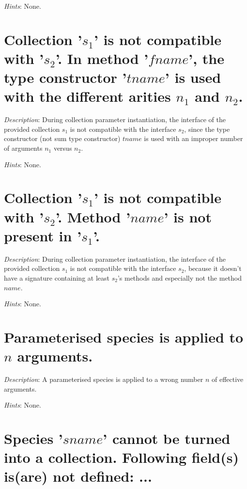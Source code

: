 {\em Hints}: None.



\section*{Collection  '$s_1$' is not compatible with '$s_2$'. In method
  '$fname$', the type constructor '$tname$' is used with the different
  arities $n_1$ and $n_2$.}

{\em Description}: During collection parameter instantiation, the interface
of the provided collection $s_1$ is not compatible with the interface $s_2$,
since the type constructor (not sum type constructor) $tname$ is used with an
improper number of arguments $n_1$ versus $n_2$.

{\em Hints}: None.



\section*{Collection  '$s_1$' is not compatible with  '$s_2$'.  Method '$name$'
  is not present in '$s_1$'.}

{\em Description}: During collection parameter instantiation, the interface
of the provided collection $s_1$ is not compatible with the interface $s_2$,
because it doesn't have a signature containing at least $s_2$'s methods and
especially not the method $name$.

{\em Hints}: None.



\section*{Parameterised species is applied to $n$ arguments.}

{\em Description}: A parameterised species is applied to a wrong
number $n$ of effective arguments.

{\em Hints}: None.



\section*{Species '$sname$' cannot be turned into a collection. Following
 field(s) is(are) not defined: ...}

